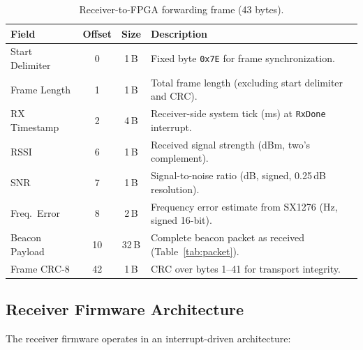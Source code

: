 \documentclass[11pt,letterpaper]{article}
\begin{document}
	\begin{table}[ht!]
		\centering
		\caption{Receiver-to-FPGA forwarding frame (43 bytes).}
		\label{tab:rxframe}
		\renewcommand{\arraystretch}{1.3}
		\begin{tabularx}{\textwidth}{l c c X}
			\toprule
			\textbf{Field} & \textbf{Offset} & \textbf{Size} & \textbf{Description} \\
			\midrule
			Start Delimiter & 0 & 1\,B & Fixed byte \texttt{0x7E} for frame synchronization. \\
			Frame Length & 1 & 1\,B & Total frame length (excluding start delimiter and CRC). \\
			RX Timestamp & 2 & 4\,B & Receiver-side system tick (ms) at \texttt{RxDone} interrupt. \\
			RSSI & 6 & 1\,B & Received signal strength (dBm, two's complement). \\
			SNR & 7 & 1\,B & Signal-to-noise ratio (dB, signed, 0.25\,dB resolution). \\
			Freq.\ Error & 8 & 2\,B & Frequency error estimate from SX1276 (Hz, signed 16-bit). \\
			Beacon Payload & 10 & 32\,B & Complete beacon packet as received (Table~\ref{tab:packet}). \\
			Frame CRC-8 & 42 & 1\,B & CRC over bytes 1--41 for transport integrity. \\
			\bottomrule
		\end{tabularx}
	\end{table}
	
	\subsection{Receiver Firmware Architecture}
	
	The receiver firmware operates in an interrupt-driven architecture:
	
\end{document}
